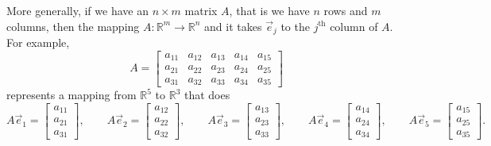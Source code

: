 More generally, if we have an $n \times m$ matrix $A$, that is we have $n$ rows
and $m$ columns, then the mapping $A \colon {\mathbb R}^m \to {\mathbb R}^n$
and it takes $\vec{e}_j$ to the $j^{\text{th}}$ column of $A$.
For example,
\begin{equation*}
A = 
\begin{bmatrix}
a_{11} & a_{12} & a_{13} & a_{14} & a_{15} \\
a_{21} & a_{22} & a_{23} & a_{24} & a_{25} \\
a_{31} & a_{32} & a_{33} & a_{34} & a_{35}
\end{bmatrix}
\end{equation*}
represents a mapping from ${\mathbb R}^5$ to ${\mathbb R}^3$ that does
\begin{equation*}
A \vec{e}_1 =
\begin{bmatrix}
a_{11} \\ a_{21} \\ a_{31}
\end{bmatrix} ,
\qquad
A \vec{e}_2 =
\begin{bmatrix}
a_{12} \\ a_{22} \\ a_{32}
\end{bmatrix} ,
\qquad
A \vec{e}_3 =
\begin{bmatrix}
a_{13} \\ a_{23} \\ a_{33}
\end{bmatrix} ,
\qquad
A \vec{e}_4 =
\begin{bmatrix}
a_{14} \\ a_{24} \\ a_{34}
\end{bmatrix} ,
\qquad
A \vec{e}_5 =
\begin{bmatrix}
a_{15} \\ a_{25} \\ a_{35}
\end{bmatrix} .
\end{equation*}

